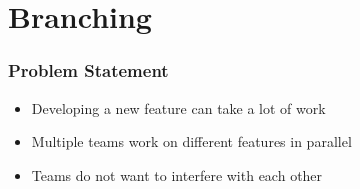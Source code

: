 
\section{Branching}

\begin{frame}
  \tableofcontents[currentsection]
\end{frame}

\begin{frame}
  \frametitle{Problem Statement}
  \begin{itemize}
    \item Developing a new feature can take a lot of work
    \item Multiple teams work on different features in parallel
    \item Teams do not want to interfere with each other
  \end{itemize}
\end{frame}

